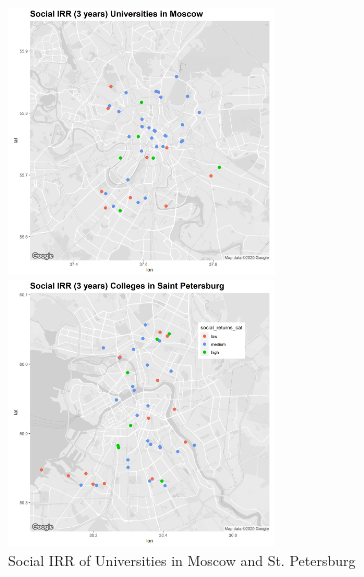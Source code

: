 \documentclass[alpha-refs]{wiley-article-05g}
\begin{document}
\begin{figure}[htp]
	\begin{minipage}[b]{.5\linewidth}
		\centering
		\hspace*{-0.4in}
		\includegraphics[width=200pt]{social_returns_moscow.png}
	\end{minipage}
	\hfill
	\begin{minipage}[b]{.5\linewidth}
		\centering
		\hspace*{-0.2in}
		\includegraphics[width=200pt]{social_returns_spb.png}
	\end{minipage}
	\caption{Social IRR of Universities in Moscow and St. Petersburg}\label{fig:1.17}
\end{figure}




\vspace{-0.2in}
\end{document}
